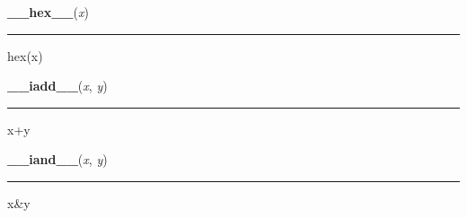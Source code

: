     \vspace{0.5ex}

    \begin{boxedminipage}{\textwidth}

    \raggedright \textbf{\_\_hex\_\_}(\textit{x})

    \vspace{-1.5ex}

    \rule{\textwidth}{0.5\fboxrule}

hex(x)
    \vspace{1ex}

    \end{boxedminipage}

    \label{numpy:ndarray:__iadd__}

    \vspace{0.5ex}

    \begin{boxedminipage}{\textwidth}

    \raggedright \textbf{\_\_iadd\_\_}(\textit{x}, \textit{y})

    \vspace{-1.5ex}

    \rule{\textwidth}{0.5\fboxrule}

x+y
    \vspace{1ex}

    \end{boxedminipage}

    \label{numpy:ndarray:__iand__}

    \vspace{0.5ex}

    \begin{boxedminipage}{\textwidth}

    \raggedright \textbf{\_\_iand\_\_}(\textit{x}, \textit{y})

    \vspace{-1.5ex}

    \rule{\textwidth}{0.5\fboxrule}

x{\&}y
    \vspace{1ex}

    \end{boxedminipage}

    \label{numpy:ndarray:__idiv__}

    \vspace{0.5ex}

